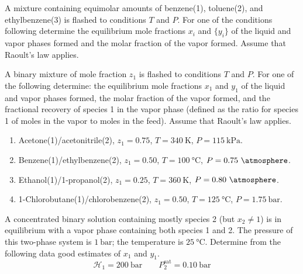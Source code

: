 \documentclass{article}
\begin{document}
\tableofcontents

A mixture containing equimolar amounts of benzene(1), toluene(2), and
ethylbenzene(3) is flashed to conditions $T$ and $P$. For one of the
conditions following determine the equilibrium mole fractions
{$x_{i}$} and $\{y_{i}\}$ of the liquid and vapor phases formed and
the molar fraction  of the vapor formed. Assume that
Raoult's law applies.
\begin{SOLUTION}
\end{SOLUTION}

A binary mixture of mole fraction $z_{1}$ is flashed to conditions
$T$ and $P$. For one of the following determine: the equilibrium mole
fractions $x_{1}$ and $y_{1}$ of the liquid and vapor phases formed,
the molar fraction  of the vapor formed, and the
fractional recovery  of species 1 in the vapor phase
(defined as the ratio for species 1 of moles in the vapor to moles in
the feed). Assume that Raoult's law applies.
\begin{enumerate}[label=(\alph*)]
  \item Acetone(1)/acetonitrile(2), $z_{1}=0.75$,
    $T=340~\unit{\kelvin}$, $P=115~\unit{\kilo\pascal}$.
  \item Benzene(1)/ethylbenzene(2), $z_{1}=0.50$,
    $T=100~\unit{\degreeCelsius}$, $P=0.75~\unit{\atmosphere}$.
  \item Ethanol(1)/1-propanol(2), $z_{1}=0.25$,
    $T=360~\unit{\kelvin}$, $P=0.80~\unit{\atmosphere}$.
  \item 1-Chlorobutane(1)/chlorobenzene(2), $z_{1}=0.50$,
    $T=125~\unit{\degreeCelsius}$, $P=1.75~\unit{\bar}$.
\end{enumerate}
\begin{SOLUTION}

\end{SOLUTION}

A concentrated binary solution containing mostly species 2 (but
$x_{2}\neq1$) is in equilibrium with a vapor phase containing both
species 1 and 2. The pressure of this two-phase system is
$1~\unit{\bar}$; the temperature is $25~\unit{\degreeCelsius}$.
Determine from the following data good estimates of $x_{1}$ and $y_{1}$.
\begin{equation*}
  \mathcal{H}_{1} = 200~\unit{\bar} \qquad P_{2}^{\text{sat}}=0.10~\unit{\bar}
\end{equation*}
\begin{SOLUTION}

\end{SOLUTION}
\end{document}
